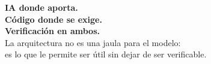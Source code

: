 \documentclass[aspectratio=169,11pt]{beamer}
\begin{document}
\begin{frame}[plain]
  \vfill
  \begin{center}
    {\Large\bfseries\color{fondoOscuro} IA donde aporta.}\\[4pt]
    {\Large\bfseries\color{azulNoche} Código donde se exige.}\\[4pt]
    {\Large\bfseries\color{verdeTurquesa} Verificación en ambos.}\\[16pt]
    {\normalsize\color{grisTexto}
      La arquitectura no es una jaula para el modelo:\\
      es lo que le permite ser útil sin dejar de ser verificable.}
  \end{center}
  \vfill
\end{frame}
\end{document}
